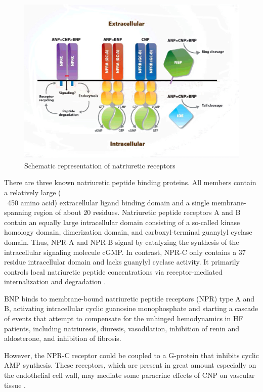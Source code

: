\documentclass[14pt,a4paper,onecolumn]{extarticle}
\begin{document}
\begin{figure}      \centering      \includegraphics[scale=1]{../../images/NP_receptors.jpg}     \small\caption{Schematic representation of natriuretic receptors}      \label{NP_receptors}  \end{figure} %

There are three known natriuretic peptide binding proteins. All members contain a relatively large (\\~450 amino acid) extracellular ligand binding domain and a single membrane-spanning region of about 20 residues. Natriuretic peptide receptors A and B contain an equally large intracellular domain consisting of a so-called kinase homology domain, dimerization domain, and carboxyl-terminal guanylyl cyclase domain. Thus, NPR-A and NPR-B signal by catalyzing the synthesis of the intracellular signaling molecule cGMP. In contrast, NPR-C only contains a 37 residue intracellular domain and lacks guanylyl cyclase activity. It primarily controls local natriuretic peptide concentrations via receptor-mediated internalization and degradation \citep{Rose2008}. %

BNP binds to membrane-bound natriuretic peptide receptors (NPR) type A and B, activating intracellular cyclic guanosine monophosphate and starting a cascade of events that attempt to compensate for the unhinged hemodynamics in HF patients, including natriuresis, diuresis, vasodilation, inhibition of renin and aldosterone, and inhibition of fibrosis. \citep{Gaggin2014} %

However, the NPR-C receptor could be coupled to a G-protein that inhibits cyclic AMP synthesis. These receptors, which are present in great amount especially on the endothelial cell wall, may mediate some paracrine effects of CNP on vascular tissue \citep{bib355}. %
\end{document}
